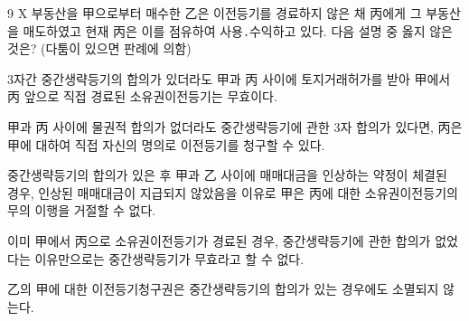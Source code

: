 \begin{question}{9}
X 부동산을 甲으로부터 매수한 乙은 이전등기를 경료하지 않은 채 丙에게 그 부동산을 매도하였고 현재 丙은 이를 점유하여 사용․수익하고 있다. 다음 설명 중 옳지 않은 것은? (다툼이 있으면 판례에 의함)
\begin{choices}
  \item 3자간 중간생략등기의 합의가 있더라도 甲과 丙 사이에 토지거래허가를 받아 甲에서 丙 앞으로 직접 경료된 소유권이전등기는 무효이다.
  \item 甲과 丙 사이에 물권적 합의가 없더라도 중간생략등기에 관한 3자 합의가 있다면, 丙은 甲에 대하여 직접 자신의 명의로 이전등기를 청구할 수 있다.
  \item 중간생략등기의 합의가 있은 후 甲과 乙 사이에 매매대금을 인상하는 약정이 체결된 경우, 인상된 매매대금이 지급되지 않았음을 이유로 甲은 丙에 대한 소유권이전등기의무의 이행을 거절할 수 없다.
  \item 이미 甲에서 丙으로 소유권이전등기가 경료된 경우, 중간생략등기에 관한 합의가 없었다는 이유만으로는 중간생략등기가 무효라고 할 수 없다.
  \item 乙의 甲에 대한 이전등기청구권은 중간생략등기의 합의가 있는 경우에도 소멸되지 않는다.
\end{choices}
\end{question}

